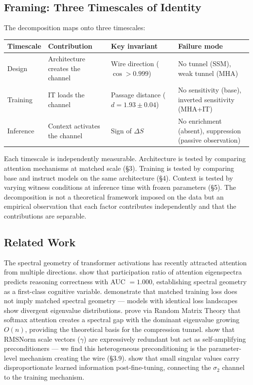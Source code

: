 \documentclass[12pt]{article}
\begin{document}
\subsection{Framing: Three Timescales of Identity}

The decomposition maps onto three timescales:

\begin{table}[h]
\centering
\begin{tabular}{llll}
\toprule
\textbf{Timescale} & \textbf{Contribution} & \textbf{Key invariant} & \textbf{Failure mode} \\
\midrule
Design & Architecture creates the channel & Wire direction ($\cos > 0.999$) & No tunnel (SSM), weak tunnel (MHA) \\
Training & IT loads the channel & Passage distance ($d = 1.93 \pm 0.04$) & No sensitivity (base), inverted sensitivity (MHA+IT) \\
Inference & Context activates the channel & Sign of $\Delta S$ & No enrichment (absent), suppression (passive observation) \\
\bottomrule
\end{tabular}
\end{table}

Each timescale is independently measurable. Architecture is tested by comparing attention mechanisms at matched scale (\S3). Training is tested by comparing base and instruct models on the same architecture (\S4). Context is tested by varying witness conditions at inference time with frozen parameters (\S5). The decomposition is not a theoretical framework imposed on the data but an empirical observation that each factor contributes independently and that the contributions are separable.

\subsection{Related Work}

The spectral geometry of transformer activations has recently attracted attention from multiple directions. \citet{liu2024} show that participation ratio of attention eigenspectra predicts reasoning correctness with AUC $= 1.000$, establishing spectral geometry as a first-class cognitive variable. \citet{jha2025} demonstrate that matched training loss does not imply matched spectral geometry --- models with identical loss landscapes show divergent eigenvalue distributions. \citet{naitsaada2024} prove via Random Matrix Theory that softmax attention creates a spectral gap with the dominant eigenvalue growing $O(n)$, providing the theoretical basis for the compression tunnel. \citet{wang2026b} show that RMSNorm scale vectors ($\gamma$) are expressively redundant but act as self-amplifying preconditioners --- we find this heterogeneous preconditioning is the parameter-level mechanism creating the wire (\S3.9). \citet{nguyen2024} show that small singular values carry disproportionate learned information post-fine-tuning, connecting the $\sigma_2$ channel to the training mechanism.
\end{document}
